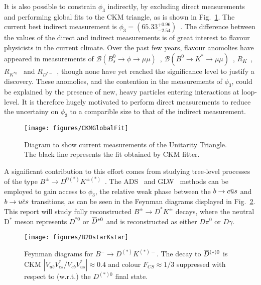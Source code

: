 \documentclass[oneside,12pt]{article}
\newcommand{\overbar}[1]{\mkern 1.5mu\overline{\mkern-1.5mu#1\mkern-1.5mu}\mkern 1.5mu}
\begin{document}
It is also possible to constrain $\phi_3$ indirectly, by excluding direct measurements and performing global fits to the CKM triangle, as is shown in Fig.~\ref{fig:CKMGlobalFit}. The current best indirect measurement is $\phi_3=(65.33^{+0.96}_{-2.54})$\degree~\cite{website:CKMFitter}. The difference between the values of the direct and indirect measurements is of great interest to flavour physicists in the current climate. Over the past few years, flavour anomolies have appeared in
measurements of $\mathcal{B} (B^{0}_{s}\rightarrow \phi \rightarrow \mu \mu)$~\cite{B2phimumu}, $\mathcal{B} (B^{0}\rightarrow K^{*}\rightarrow \mu \mu)$~\cite{B2Kstmumu}, $R_{K}$~\cite{Rk}, $R_{K^{*0}}$~\cite{Rkst} and $R_{D^{*-}}$~\cite{RDst}, though none have yet reached the significance level to justify a discovery. These anomolies, and the contention in the measurements of $\phi_3$, could be explained by the presence of new, heavy particles entering interactions at loop-level. It is therefore hugely motivated to perform direct measurements to reduce the uncertainy on $\phi_{3}$ to a comparible size to that of the indirect
measurement.
\begin{figure}[H]
  \centering
  \texttt{[image: figures/CKMGlobalFit]}
  \caption{\small{Diagram to show current measurements of the Unitarity Triangle. The black line represents the fit obtained by CKM fitter.}}
  \label{fig:CKMGlobalFit}
  \vspace{-10pt}
\end{figure}
\noindent A significant contribution to this effort comes from studying tree-level processes of the type $B^{\pm}\rightarrow D^{0(*)}K^{\pm (*)}$~\cite{B2DKD2hh, DalitzRun1, DalitzRun2, B2DKstD2hh, B2DstKD2hh}. The ADS~\cite{ADSRef} and GLW~\cite{GLWRef} methods can be employed to gain access to $\phi_3$, the relative weak phase between the $b\rightarrow c\overbar{u}s$ and $b\rightarrow u\overbar{c}s$ transitions, as can be seen in the Feynman diagrams displayed in Fig.~\ref{fig:B2DstarKstar}. This report will study fully reconstructed $B^{\pm}\rightarrow D^{*}K^{\pm}$ decays, where the neutral D$^{*}$ meson represents $D^{*0}$ or $\overbar{D}^{*0}$ and is reconstructed as either $D\pi^{0}$ or $D\gamma$. 
\begin{figure}[H]
  \centering
  \texttt{[image: figures/B2DstarKstar]}
  \caption{\small{Feynman diagrams for ${B}^{-}\rightarrow{D}^{(*)}{K}^{(*)-}$}. The decay to $\overbar{{D}}^{(*)0}$ is CKM $|V_{ub}V^{*}_{cs}/V_{cb}V^{*}_{us}|\approx0.4$ and colour ${F}_{CS}\approx1/3$ suppressed with respect to (w.r.t.) the ${D}^{(*)0}$ final state.}
  \label{fig:B2DstarKstar}
  \vspace{-10pt}
\end{figure}
\end{document}
